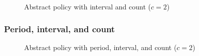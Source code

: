 \begin{figure}[H]
  \centering
  
  \caption{Abstract policy with interval and count ($c = 2$)}
\end{figure}


\subsubsection{Period, interval, and count}


\begin{figure}[H]
  \centering
  
  \caption{Abstract policy with period, interval, and count ($c = 2$)}
\end{figure}
